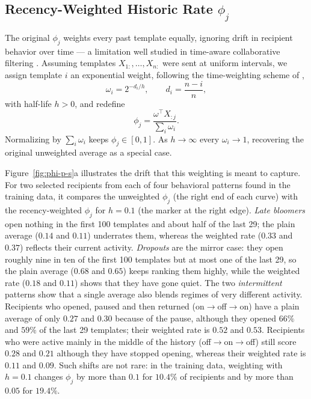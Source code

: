 \subsection{Recency-Weighted Historic Rate $\phi_j$}
\label{sec:recency-phi}

The original $\phi_j$ weights every past template equally, ignoring drift
in recipient behavior over time --- a limitation well studied in
time-aware collaborative filtering \citep{ding2005time,koren2009collaborative}.
Assuming templates
$X_{1:},\dots,X_{n:}$ were sent at uniform intervals, we assign template
$i$ an exponential weight, following the time-weighting scheme of
\citet{ding2005time},
\begin{equation}
\label{eq:omega}
\omega_i = 2^{-d_i/h}, \qquad d_i = \frac{n-i}{n},
\end{equation}
with half-life $h>0$, and redefine
\begin{equation}
\label{eq:phi-weighted}
\phi_j = \frac{\omega^\top X_{:j}}{\sum_i \omega_i}.
\end{equation}
Normalizing by $\sum_i\omega_i$ keeps $\phi_j\in[0,1]$. As $h\to\infty$
every $\omega_i\to1$, recovering the original unweighted average as a
special case.

Figure~\ref{fig:phi-p-s}a illustrates the drift that this weighting is meant
to capture. For two selected recipients from each of four behavioral patterns
found in the training data, it compares the unweighted $\phi_j$ (the right end
of each curve) with the recency-weighted $\phi_j$ for $h=0.1$ (the marker at
the right edge). \emph{Late bloomers} open nothing in the first 100 templates
and about half of the last 29; the plain average ($0.14$ and $0.11$) underrates
them, whereas the weighted rate ($0.33$ and $0.37$) reflects their current
activity. \emph{Dropouts} are the mirror case: they open roughly nine in ten of
the first 100 templates but at most one of the last 29, so the plain average
($0.68$ and $0.65$) keeps ranking them highly, while the weighted rate ($0.18$
and $0.11$) shows that they have gone quiet. The two \emph{intermittent}
patterns show that a single average also blends regimes of very different
activity. Recipients who opened, paused and then returned
(on$\to$off$\to$on) have a plain average of only $0.27$ and $0.30$ because of
the pause, although they opened $66\%$ and $59\%$ of the last 29 templates;
their weighted rate is $0.52$ and $0.53$. Recipients who were active mainly
in the middle of the history (off$\to$on$\to$off) still score $0.28$ and $0.21$
although they have stopped opening, whereas their weighted rate is $0.11$ and
$0.09$. Such shifts are not rare: in the training data, weighting with
$h=0.1$ changes $\phi_j$ by more than $0.1$ for $10.4\%$ of recipients and by
more than $0.05$ for $19.4\%$.

